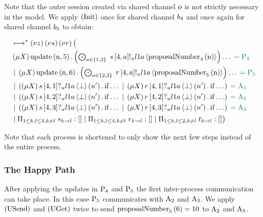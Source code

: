 Note that the outer session created via shared channel $\OuterSharedPoint$ is not strictly necessary in the model.
We apply $\RInit$ once for shared channel $\SharedPoint{4}$ and once again for shared channel $\SharedPoint{5}$ to obtain:

\begin{align*}
&\mapstostar \NuChannels\big (\\
&\Mu{\RecursionVariable} \update{\NumberRegister}{5} . \DotForall{\AcceptorRole\in \{1,2\}}{\SendUnreliableP{s}{4}{\AcceptorRole}{\LOneA}{\proposalNumber{\NumberRegister}{4}}}\dots \comment{= \Proposer{4}}\\
&\Or \Mu{\RecursionVariable} \update{\NumberRegister}{6} . \DotForall{\AcceptorRole\in \{2,3\}}{\SendUnreliableP{r}{4}{\AcceptorRole}{\LOneA}{\proposalNumber{\NumberRegister}{5}}}\dots \comment{= \Proposer{5}}\\
&\Or \Paren{
    \Mu{\RecursionVariable} \ReceiveUnreliableP{s}{4}{1}{\LOneA}{\bot}{n'}.\If{\dots}
    \Or \Mu{\RecursionVariable} \ReceiveUnreliableP{r}{4}{1}{\LOneA}{\bot}{n'}.\If{\dots}
} \comment{= \Acceptor{1}}\\
&\Or \Paren{
    \Mu{\RecursionVariable} \ReceiveUnreliableP{s}{4}{2}{\LOneA}{\bot}{n'}.\If{\dots}
    \Or \Mu{\RecursionVariable} \ReceiveUnreliableP{r}{4}{2}{\LOneA}{\bot}{n'}.\If{\dots}
} \comment{= \Acceptor{2}}\\
&\Or \Paren{
    \Mu{\RecursionVariable} \ReceiveUnreliableP{s}{4}{3}{\LOneA}{\bot}{n'}.\If{\dots}
    \Or \Mu{\RecursionVariable} \ReceiveUnreliableP{r}{4}{3}{\LOneA}{\bot}{n'}.\If{\dots}
} \comment{= \Acceptor{3}}\\
&\Or \InnerSessionQueues{s}
\Or \InnerSessionQueues{r}
\Or \OuterSessionQueues
\big )
\end{align*}

Note that each process is shortened to only show the next few steps instead of the entire process.

\subsubsection{The Happy Path}
After applying the updates in $\Proposer{4}$ and $\Proposer{5}$ the first inter-process communication can take place.
In this case $\Proposer{5}$ communicates with $\Acceptor{2}$ and $\Acceptor{3}$.
We apply $\RUsend$ and $\RUget$ twice to send $\proposalNumber{6}{5} = 10$ to $\Acceptor{2}$ and $\Acceptor{3}$.

